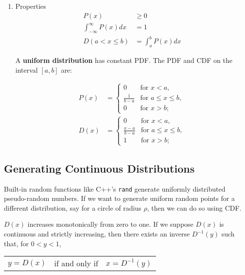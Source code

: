 \documentclass[11pt]{article}
\begin{document}
\begin{enumerate}
\item Properties
\label{sec:org315dedb}
 \begin{align*}
     P\left( x \right) &\geq 0 \\
     \int_{-\infty}^{\infty} P\left( x \right)dx &= 1 \\
     D\left( a < x \leq b \right) &= \int_{a}^{b} P\left( x \right)dx
\end{align*}

A \textbf{uniform distribution} has constant PDF. The PDF and CDF on the interval \(\left[ a,b \right]\) are:

\begin{align*}
    P\left( x \right) &= \begin{cases}
                             0 &\text{for } x < a, \\
                             \frac{1}{b - a} &\text{for } a \leq x \leq b, \\
                             0 &\text{for } x > b;
                         \end{cases} \\
    D\left( x \right) &= \begin{cases}
                             0 &\text{for } x < a, \\
                             \frac{x - a}{b - a} &\text{for } a \leq x \leq b, \\
                             1 &\text{for } x > b;
                         \end{cases}
\end{align*}
\end{enumerate}

\subsection{Generating Continuous Distributions}
\label{sec:orgea58189}
Built-in random functions like C++'s \texttt{rand} generate uniformly distributed pseudo-random numbers. If we want to generate uniform random points for a different distribution, say for a circle of radius \(\rho\), then we can do so using CDF.

\(D\left( x \right)\) increases monotonically from zero to one. If we suppose \(D\left( x \right)\) is continuous and strictly increasing, then there exists an inverse \(D^{-1}\left( y \right)\) such that, for \(0 < y < 1\),

\begin{center}
    \begin{tabular}{ c c c }
        $y = D\left( x \right)$ & if and only if & $x = D^{-1}\left( y \right)$
    \end{tabular}
\end{center}
\end{document}
